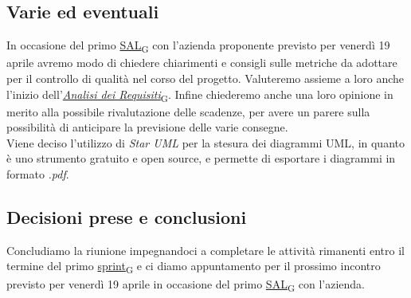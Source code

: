 \documentclass[italian,12pt]{article}
\begin{document}
\subsection{Varie ed eventuali}
In occasione del primo \href{https://7last.github.io/docs/rtb/documentazione-interna/glossario#sal}{SAL\textsubscript{G}} con l'azienda proponente previsto per venerdì 19 aprile avremo modo di chiedere chiarimenti e consigli sulle metriche da adottare per il controllo di qualità nel corso del progetto. Valuteremo assieme a loro anche l'inizio dell'\href{https://7last.github.io/docs/rtb/documentazione-interna/glossario#analisi-dei-requisiti}{\textit{Analisi dei Requisiti}\textsubscript{G}}. Infine chiederemo anche una loro opinione in merito alla possibile rivalutazione delle scadenze, per avere un parere sulla possibilità di anticipare la previsione delle varie consegne. \\
Viene deciso l'utilizzo di \textit{Star UML} per la stesura dei diagrammi UML, in quanto è uno strumento gratuito e open source, e permette di esportare i diagrammi in formato \textit{.pdf}.

\subsection{Decisioni prese e conclusioni}
Concludiamo la riunione impegnandoci a completare le attività rimanenti entro il termine del primo \href{https://7last.github.io/docs/rtb/documentazione-interna/glossario#sprint}{sprint\textsubscript{G}} e ci diamo appuntamento per il prossimo incontro previsto per venerdì 19 aprile in occasione del primo \href{https://7last.github.io/docs/rtb/documentazione-interna/glossario#sal}{SAL\textsubscript{G}} con l'azienda.
\end{document}

